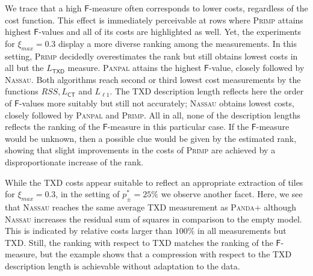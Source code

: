 We trace that a high $\mathsf{F}$-measure often corresponds to lower costs, regardless of the cost function. This effect is immediately perceivable at rows where \textsc{Primp} attains highest $\mathsf{F}$-values and all of its costs are highlighted as well. Yet, the experiments for $\xi_{max}=0.3$ display a  more diverse ranking among the measurements. In this setting, \textsc{Primp} decidedly overestimates the rank but still obtains lowest costs in all but the $L_\mathsf{TXD}$ measure. \textsc{Panpal} attains the highest $\mathsf{F}$-value, closely followed by \textsc{Nassau}. Both algorithms reach second or third lowest cost measurements by the functions $RSS,L_{\mathsf{CT}}$ and $L_{\ell 1}$. The TXD description length reflects here the order of $\mathsf{F}$-values more suitably but still not accurately; \textsc{Nassau} obtains lowest costs, closely followed by \textsc{Panpal} and \textsc{Primp}. All in all, none of the description lengths reflects the ranking of the $\mathsf{F}$-measure in this particular case. If the $\mathsf{F}$-measure would be unknown, then a possible clue would be given by the estimated rank, showing that slight improvements in the costs of \textsc{Primp} are achieved by a disproportionate increase of the rank. 

While the TXD costs appear suitable to reflect an appropriate extraction of tiles for $\xi_{max}=0.3$, in the setting of $p_\pm^*=25\%$ we observe another facet. Here, we see that  \textsc{Nassau} reaches the same average TXD measurement as \textsc{Panda+} although \textsc{Nassau} increases the residual sum of squares in comparison to the empty model. This is indicated by relative costs larger than $100\%$ in all measurements but TXD. Still, the ranking with respect to TXD matches the ranking of the $\mathsf{F}$-measure, but the example shows that a compression with respect to the TXD description length is achievable without adaptation to the data.

